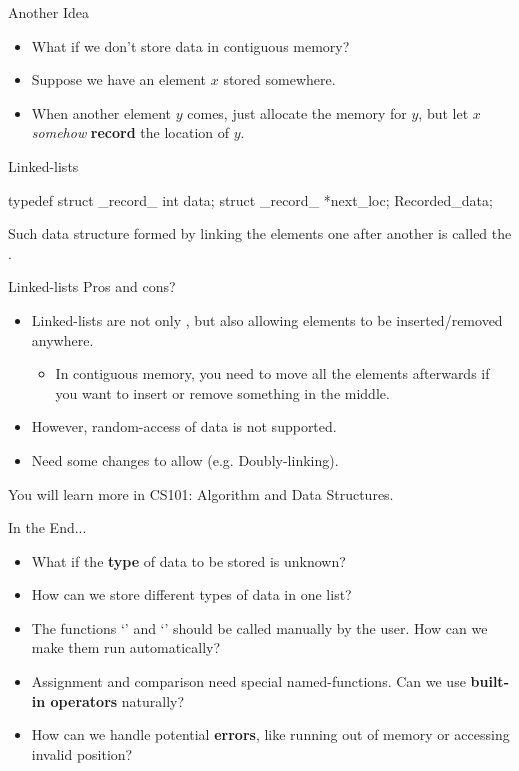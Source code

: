 \documentclass{beamer}
\begin{document}
\begin{frame}{Another Idea}
    \begin{itemize}
        \item What if we don't store data in contiguous memory?
        \pause
        \item Suppose we have an element \(x\) stored somewhere.
        \item When another element \(y\) comes, just allocate the memory for \(y\), but let \(x\) \textit{somehow} \textbf{record} the location of \(y\).
    \end{itemize}
\end{frame}

\begin{frame}[fragile]{Linked-lists}
    \begin{cpp}
typedef struct _record_ {
  int data;
  struct _record_ *next_loc;
} Recorded_data;
    \end{cpp}
    \pause
    Such data structure formed by linking the elements one after another is called the .
\end{frame}

\begin{frame}[fragile]{Linked-lists}
    Pros and cons?
    \pause
    \begin{itemize}
        \item Linked-lists are not only , but also allowing elements to be inserted/removed anywhere.
        \begin{itemize}
            \item In contiguous memory, you need to move all the elements afterwards if you want to insert or remove something in the middle.
        \end{itemize}
        \pause
        \item However, random-access of data is not supported.
        \pause
        \item Need some changes to allow  (e.g. Doubly-linking).
    \end{itemize}
    \pause
    You will learn more in CS101: Algorithm and Data Structures.
\end{frame}

\begin{frame}{In the End...}
    \begin{itemize}
        \item What if the \textbf{type} of data to be stored is unknown?
        \item How can we store different types of data in one list?
        \item The functions `' and `' should be called manually by the user. How can we make them run automatically?
        \item Assignment and comparison need special named-functions. Can we use \textbf{built-in operators} naturally?
        \item How can we handle potential \textbf{errors}, like running out of memory or accessing invalid position?
    \end{itemize}
    \pause
\end{frame}
\end{document}
